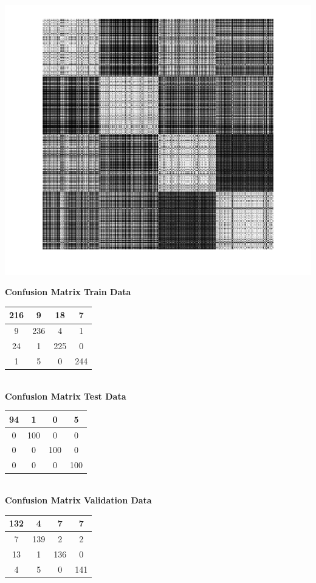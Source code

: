 \documentclass{article}
\begin{document}
\begin{center}
\includegraphics[scale=0.6]{Classification/1c/c_g/kgm}
\end{center}
\begin{flushleft}
\textbf{Confusion Matrix Train Data\\[5pt]}
\begin{tabular}{|c|c|c|c|}
\hline
216 & 9 & 18 & 7 \\
\hline
9 & 236 & 4 & 1 \\
\hline
24 & 1 & 225 & 0 \\
\hline
1 & 5 & 0 & 244 \\
\hline
\end{tabular}
\textbf{\\[10pt] Confusion Matrix Test Data \\[5pt]}
\begin{tabular}{|c|c|c|c|}
\hline
94 & 1 & 0 & 5 \\
\hline
0 & 100 & 0 & 0 \\
\hline
0 & 0 & 100 & 0 \\
\hline
0 & 0 & 0 & 100 \\
\hline
\end{tabular}
\textbf{\\[10pt] Confusion Matrix Validation Data \\[5pt]}
\begin{tabular}{|c|c|c|c|}
\hline
132 & 4 & 7 & 7 \\
\hline
7 & 139 & 2 & 2 \\
\hline
13 & 1 & 136 & 0 \\
\hline
4 & 5 & 0 & 141 \\
\hline
\end{tabular}
\end{flushleft}
\end{document}

